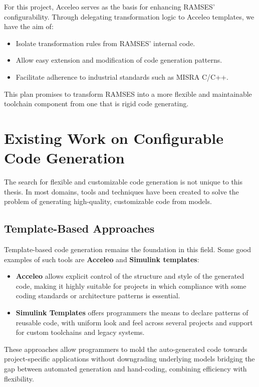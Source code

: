 For this project, Acceleo serves as the basis for enhancing RAMSES' configurability. Through delegating transformation logic to Acceleo templates, we have the aim of: 
\begin{itemize} 
	\item Isolate transformation rules from RAMSES' internal code.
	\item Allow easy extension and modification of code generation patterns.
	\item Facilitate adherence to industrial standards such as \gls{MISRA} C/C++.
\end{itemize}

This plan promises to transform RAMSES into a more flexible and maintainable toolchain component from one that is rigid code generating.


\section{Existing Work on Configurable Code Generation} \label{sec:configurable_generation}

The search for flexible and customizable code generation is not unique to this thesis. In most domains, tools and techniques have been created to solve the problem of generating high-quality, customizable code from models.

\subsection*{Template-Based Approaches}

Template-based code generation remains the foundation in this field. Some good examples of such tools are \textbf{Acceleo} and \textbf{Simulink templates}: 

\begin{itemize} 
	\item \textbf{Acceleo} allows explicit control of the structure and style of the generated code, making it highly suitable for projects in which compliance with some coding standards or architecture patterns is essential. 
	\item \textbf{Simulink Templates} offers programmers the means to declare patterns of reusable code, with uniform look and feel across several projects and support for custom toolchains and legacy systems.
\end{itemize}

These approaches allow programmers to mold the auto-generated code towards project-specific applications without downgrading underlying models bridging the gap between automated generation and hand-coding, combining efficiency with flexibility.

